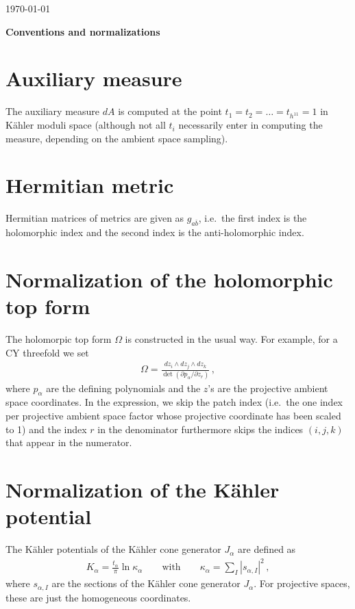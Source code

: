\documentclass[11pt]{article}
\begin{document}
\begin{flushright}
\today
\end{flushright}
\begin{center}
{\huge\bfseries Conventions and normalizations}\\[5mm]
\end{center}

\section{Auxiliary measure}
The auxiliary measure $dA$ is computed at the point $t_1=t_2=\ldots=t_{h^{11}}=1$ in K\"ahler moduli space (although not all $t_i$ necessarily enter in computing the measure, depending on the ambient space sampling).

\section{Hermitian metric}
Hermitian matrices of metrics are given as $g_{a\bar b}$, i.e.\ the first index is the holomorphic index and the second index is the anti-holomorphic index.

\section{Normalization of the holomorphic top form}
The holomorpic top form $\Omega$ is constructed in the usual way. For example, for a CY threefold we set
\begin{align*}
\Omega=\frac{dz_i\wedge dz_j \wedge dz_k}{\det (\partial p_\alpha/\partial z_{r})}\,,
\end{align*}
where $p_\alpha$ are the defining polynomials and the $z$'s are the projective ambient space coordinates. In the expression, we skip the patch index (i.e.\ the one index per projective ambient space factor whose projective coordinate has been scaled to 1) and the index $r$ in the denominator furthermore skips the indices $(i,j,k)$ that appear in the numerator.

\section{Normalization of the K\"ahler potential}
The K\"ahler potentials of the K\"ahler cone generator $J_\alpha$ are defined as 
\begin{align*}
K_\alpha=\frac{t_\alpha}{\pi}\ln\kappa_\alpha \qquad\text{with}\qquad \kappa_\alpha=\sum_{I}{|s_{\alpha,I}|^2}\,,
\end{align*}
where $s_{\alpha,I}$ are the sections of the K\"ahler cone generator $J_\alpha$. For projective spaces, these are just the homogeneous coordinates.
\end{document}
